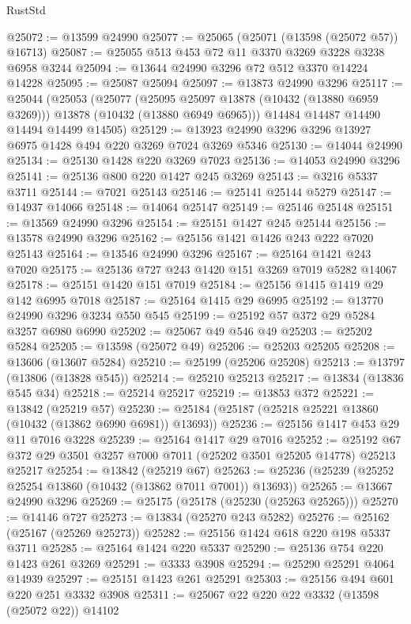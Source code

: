 \begin{lexlean}{RustStd}
\begin{coremodule}
@25072 := @13599 @24990
@25077 := @25065 (@25071 (@13598 (@25072 @57)) @16713)
@25087 := @25055 @513 @453 @72 @11 @3370 @3269 @3228 @3238 @6958 @3244
@25094 := @13644 @24990 @3296 @72 @512 @3370 @14224 @14228
@25095 := @25087 @25094
@25097 := @13873 @24990 @3296
@25117 := @25044
    (@25053
      (@25077
        (@25095 @25097 @13878 (@10432 (@13880 @6959 @3269)))
        @13878
        (@10432 (@13880 @6949 @6965)))
      @14484
      @14487
      @14490
      @14494
      @14499
      @14505)
@25129 := @13923 @24990 @3296 @3296 @13927 @6975 @1428 @494 @220 @3269 @7024 @3269 @5346
@25130 := @14044 @24990
@25134 := @25130 @1428 @220 @3269 @7023
@25136 := @14053 @24990 @3296
@25141 := @25136 @800 @220 @1427 @245 @3269
@25143 := @3216 @5337 @3711
@25144 := @7021 @25143
@25146 := @25141 @25144 @5279
@25147 := @14937 @14066
@25148 := @14064 @25147
@25149 := @25146 @25148
@25151 := @13569 @24990 @3296
@25154 := @25151 @1427 @245 @25144
@25156 := @13578 @24990 @3296
@25162 := @25156 @1421 @1426 @243 @222 @7020 @25143
@25164 := @13546 @24990 @3296
@25167 := @25164 @1421 @243 @7020
@25175 := @25136 @727 @243 @1420 @151 @3269 @7019 @5282 @14067
@25178 := @25151 @1420 @151 @7019
@25184 := @25156 @1415 @1419 @29 @142 @6995 @7018
@25187 := @25164 @1415 @29 @6995
@25192 := @13770 @24990 @3296 @3234 @550 @545
@25199 := @25192 @57 @372 @29 @5284 @3257 @6980 @6990
@25202 := @25067 @49 @546 @49
@25203 := @25202 @5284
@25205 := @13598 (@25072 @49)
@25206 := @25203 @25205
@25208 := @13606 (@13607 @5284)
@25210 := @25199 (@25206 @25208)
@25213 := @13797 (@13806 (@13828 @545))
@25214 := @25210 @25213
@25217 := @13834 (@13836 @545 @34)
@25218 := @25214 @25217
@25219 := @13853 @372
@25221 := @13842 (@25219 @57)
@25230 := @25184 (@25187 (@25218 @25221 @13860 (@10432 (@13862 @6990 @6981)) @13693))
@25236 := @25156 @1417 @453 @29 @11 @7016 @3228
@25239 := @25164 @1417 @29 @7016
@25252 := @25192 @67 @372 @29 @3501 @3257 @7000 @7011 (@25202 @3501 @25205 @14778) @25213 @25217
@25254 := @13842 (@25219 @67)
@25263 := @25236 (@25239 (@25252 @25254 @13860 (@10432 (@13862 @7011 @7001)) @13693))
@25265 := @13667 @24990 @3296
@25269 := @25175 (@25178 (@25230 (@25263 @25265)))
@25270 := @14146 @727
@25273 := @13834 (@25270 @243 @5282)
@25276 := @25162 (@25167 (@25269 @25273))
@25282 := @25156 @1424 @618 @220 @198 @5337 @3711
@25285 := @25164 @1424 @220 @5337
@25290 := @25136 @754 @220 @1423 @261 @3269
@25291 := @3333 @3908
@25294 := @25290 @25291 @4064 @14939
@25297 := @25151 @1423 @261 @25291
@25303 := @25156 @494 @601 @220 @251 @3332 @3908
@25311 := @25067 @22 @220 @22 @3332 (@13598 (@25072 @22)) @14102

\end{coremodule}
\end{lexlean}
